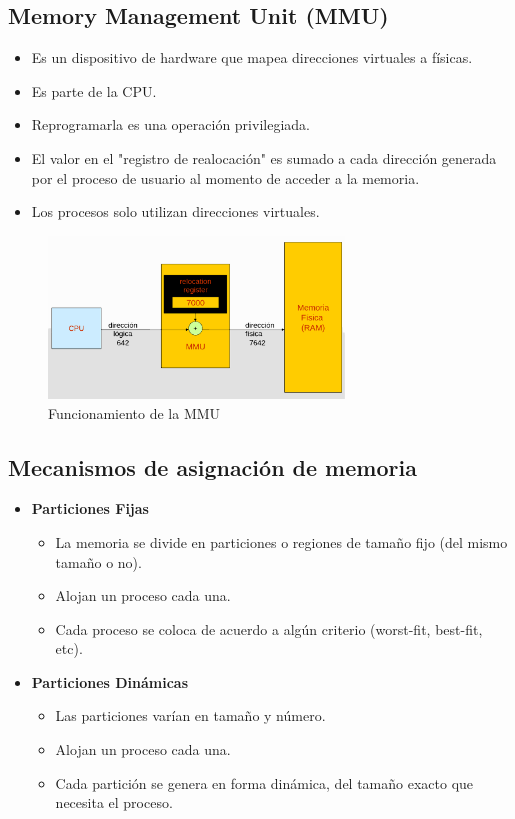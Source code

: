 \subsection{Memory Management Unit (MMU)}
\begin{itemize}
    \item Es un dispositivo de hardware que mapea direcciones virtuales a físicas.
    \item Es parte de la CPU.
    \item Reprogramarla es una operación privilegiada.
    \item El valor en el "registro de realocación" es sumado a cada dirección generada por el proceso de usuario al momento de acceder a la memoria.
    \item Los procesos solo utilizan direcciones virtuales.
\end{itemize}
\begin{figure}[h]
    \begin{center}
        \includegraphics[width=0.70\textwidth]{assets/MMU.pdf}
    \end{center}
    \caption{Funcionamiento de la MMU}\label{fig:}
\end{figure}

\subsection{Mecanismos de asignación de memoria}
\begin{itemize}
    \item \textbf{Particiones Fijas}
    \begin{itemize}
        \item La memoria se divide en particiones o regiones de tamaño fijo (del mismo tamaño o no).
        \item Alojan un proceso cada una.
        \item Cada proceso se coloca de acuerdo a algún criterio (worst-fit, best-fit, etc).
    \end{itemize}
    \item \textbf{Particiones Dinámicas}
    \begin{itemize}
        \item Las particiones varían en tamaño y número.
        \item Alojan un proceso cada una.
        \item Cada partición se genera en forma dinámica, del tamaño exacto que necesita el proceso.
    \end{itemize}
\end{itemize}

